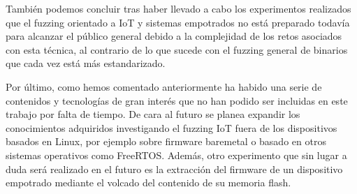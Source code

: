 También podemos concluir tras haber llevado a cabo los experimentos realizados que el fuzzing orientado a IoT y sistemas empotrados no 
está preparado todavía para alcanzar el público general debido a la complejidad de los retos asociados con esta técnica, al contrario de 
lo que sucede con el fuzzing general de binarios que cada vez está más estandarizado.\bigskip

Por último, como hemos comentado anteriormente ha habido una serie de contenidos y tecnologías de gran interés que no han podido ser 
incluidas en este trabajo por falta de tiempo. De cara al futuro se planea expandir los conocimientos adquiridos investigando el 
fuzzing IoT fuera de los dispositivos basados en Linux, por ejemplo sobre firmware baremetal o basado en otros sistemas operativos 
como FreeRTOS. Además, otro experimento que sin lugar a duda será realizado en el futuro es la extracción del firmware de un dispositivo
empotrado mediante el volcado del contenido de su memoria flash.